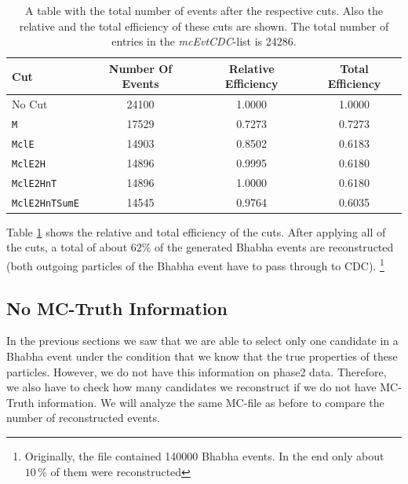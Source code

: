 \documentclass[a4paper,11pt,twosided,final,german,openbib,pdftex,listof=totoc,bibliography=totoc]{scrbook}
\begin{document}
\begin{table}[h!]
	\centering
\begin{tabular}{lccc}
 Cut& Number Of Events&  Relative Efficiency& Total Efficiency\\
 \hline
 No Cut&24100 &1.0000 &1.0000 \\
 \texttt{M}& 17529&0.7273 &0.7273 \\
 \texttt{MclE}&14903 &0.8502 &0.6183 \\
 \texttt{MclE2H}&14896&0.9995  &0.6180 \\
 \texttt{MclE2HnT}&14896 &1.0000 &0.6180 \\
 \texttt{MclE2HnTSumE}& 14545 &0.9764 &0.6035 \\

\end{tabular}

\caption[Cut Efficiencies]{A table with the total number of events after the respective cuts. Also the relative and the total efficiency of these cuts are shown. The total number of entries in the \textit{mcEvtCDC}-list is 24286.}
\label{tab:cutEff}
\end{table}

Table \ref{tab:cutEff} shows the relative and total efficiency of the cuts. After applying all of the cuts, a total of about $62\%$ of the generated Bhabha events are reconstructed (both outgoing particles of the Bhabha event have to pass through to CDC).
\footnote{Originally, the file contained 140000 Bhabha events. In the end only about $10\,\%$ of them were reconstructed}

\subsection{No MC-Truth Information}
\label{sec:NoMCT}

In the previous sections we saw that we are able to select only one candidate in a Bhabha event under the condition that we know that the true properties of these particles. However, we do not have this information on phase2 data. Therefore, we also have to check how many candidates we reconstruct if we do not have MC-Truth information. We will analyze the same MC-file as before to compare the number of reconstructed events. 
\end{document}
